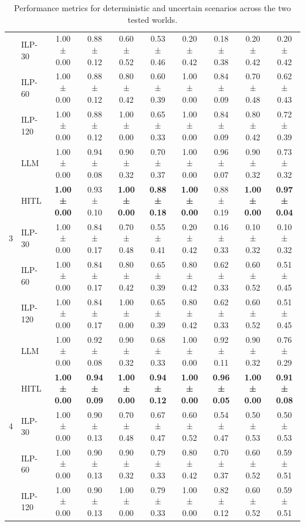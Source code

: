 \begin{table}[t]
\begin{tabular}{cl|cc|cc|cc|cc}
 & ILP-30 & 1.00 ± 0.00 & 0.88 ± 0.12 & 0.60 ± 0.52 & 0.53 ± 0.46 & 0.20 ± 0.42 & 0.18 ± 0.38 & 0.20 ± 0.42 & 0.20 ± 0.42 \\
 & ILP-60 & 1.00 ± 0.00 & 0.88 ± 0.12 & 0.80 ± 0.42 & 0.60 ± 0.39 & 1.00 ± 0.00 & 0.84 ± 0.09 & 0.70 ± 0.48 & 0.62 ± 0.43 \\
 & ILP-120 & 1.00 ± 0.00 & 0.88 ± 0.12 & 1.00 ± 0.00 & 0.65 ± 0.33 & 1.00 ± 0.00 & 0.84 ± 0.09 & 0.80 ± 0.42 & 0.72 ± 0.39 \\
\hline
\multirow{5}{*}{3} & LLM & 1.00 ± 0.00 & 0.94 ± 0.08 & 0.90 ± 0.32 & 0.70 ± 0.37 & 1.00 ± 0.00 & 0.96 ± 0.07 & 0.90 ± 0.32 & 0.73 ± 0.32 \\
 & \cellcolor{green!20}HITL & \textbf{\cellcolor{green!20}1.00 ± 0.00} & \cellcolor{green!20}0.93 ± 0.10 & \textbf{\cellcolor{green!20}1.00 ± 0.00} & \textbf{\cellcolor{green!20}0.88 ± 0.18} & \textbf{\cellcolor{green!20}1.00 ± 0.00} & \cellcolor{green!20}0.88 ± 0.19 & \textbf{\cellcolor{green!20}1.00 ± 0.00} & \textbf{\cellcolor{green!20}0.97 ± 0.04} \\
 & ILP-30 & 1.00 ± 0.00 & 0.84 ± 0.17 & 0.70 ± 0.48 & 0.55 ± 0.41 & 0.20 ± 0.42 & 0.16 ± 0.33 & 0.10 ± 0.32 & 0.10 ± 0.32 \\
 & ILP-60 & 1.00 ± 0.00 & 0.84 ± 0.17 & 0.80 ± 0.42 & 0.65 ± 0.39 & 0.80 ± 0.42 & 0.62 ± 0.33 & 0.60 ± 0.52 & 0.51 ± 0.45 \\
 & ILP-120 & 1.00 ± 0.00 & 0.84 ± 0.17 & 1.00 ± 0.00 & 0.65 ± 0.39 & 0.80 ± 0.42 & 0.62 ± 0.33 & 0.60 ± 0.52 & 0.51 ± 0.45 \\
\hline
\multirow{5}{*}{4} & LLM & 1.00 ± 0.00 & 0.92 ± 0.08 & 0.90 ± 0.32 & 0.68 ± 0.33 & 1.00 ± 0.00 & 0.92 ± 0.11 & 0.90 ± 0.32 & 0.76 ± 0.29 \\
 & \cellcolor{green!20}HITL & \textbf{\cellcolor{green!20}1.00 ± 0.00} & \textbf{\cellcolor{green!20}0.94 ± 0.09} & \textbf{\cellcolor{green!20}1.00 ± 0.00} & \textbf{\cellcolor{green!20}0.94 ± 0.12} & \textbf{\cellcolor{green!20}1.00 ± 0.00} & \textbf{\cellcolor{green!20}0.96 ± 0.05} & \textbf{\cellcolor{green!20}1.00 ± 0.00} & \textbf{\cellcolor{green!20}0.91 ± 0.08} \\
 & ILP-30 & 1.00 ± 0.00 & 0.90 ± 0.13 & 0.70 ± 0.48 & 0.67 ± 0.47 & 0.60 ± 0.52 & 0.54 ± 0.47 & 0.50 ± 0.53 & 0.50 ± 0.53 \\
 & ILP-60 & 1.00 ± 0.00 & 0.90 ± 0.13 & 0.90 ± 0.32 & 0.79 ± 0.33 & 0.80 ± 0.42 & 0.70 ± 0.37 & 0.60 ± 0.52 & 0.59 ± 0.51 \\
 & ILP-120 & 1.00 ± 0.00 & 0.90 ± 0.13 & 1.00 ± 0.00 & 0.79 ± 0.33 & 1.00 ± 0.00 & 0.82 ± 0.12 & 0.60 ± 0.52 & 0.59 ± 0.51 \\
\bottomrule
\end{tabular}
\caption{Performance metrics for deterministic and uncertain scenarios across the two tested worlds.}
\label{tab:metrics}
\end{table}